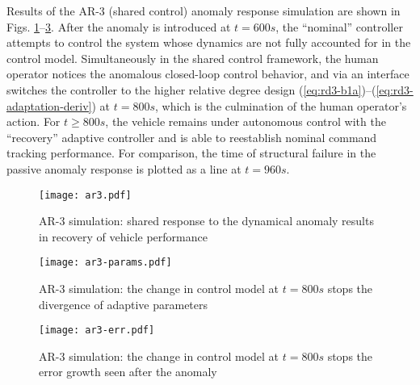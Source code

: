 Results of the AR-3 (shared control) anomaly response simulation are shown in Figs. \ref{fig:ar3-sim}--\ref{fig:ar3-err}. After the anomaly is introduced at $t = 600 s$, the ``nominal'' controller attempts to control the system whose dynamics are not fully accounted for in the control model. Simultaneously in the shared control framework, the human operator notices the anomalous closed-loop control behavior, and via an interface switches the controller to the higher relative degree design (\ref{eq:rd3-b1a})--(\ref{eq:rd3-adaptation-deriv}) at $t = 800 s$, which is the culmination of the human operator's action. For $t \geq 800 s$, the vehicle remains under autonomous control with the ``recovery'' adaptive controller and is able to reestablish nominal command tracking performance. For comparison, the time of structural failure in the passive anomaly response is plotted as a line at $t = 960 s$.

\begin{figure}[htbp]
	\centering
	\texttt{[image: ar3.pdf]}
	\caption{AR-3 simulation: shared response to the dynamical anomaly results in recovery of vehicle performance}
	\label{fig:ar3-sim}
\end{figure}

\begin{figure}[htbp]
	\centering
	\texttt{[image: ar3-params.pdf]}
	\caption{AR-3 simulation: the change in control model at $t = 800 s$ stops the divergence of adaptive parameters}
	\label{fig:ar3-params}
\end{figure}

\begin{figure}[htbp]
	\centering
	\texttt{[image: ar3-err.pdf]}
	\caption{AR-3 simulation: the change in control model at $t = 800 s$ stops the error growth seen after the anomaly}
	\label{fig:ar3-err}
\end{figure}
